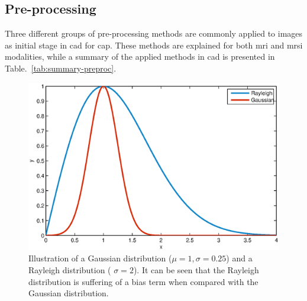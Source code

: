 \subsection{Pre-processing}\label{subsec:chp3img-reg:prepro}
Three different groups of pre-processing methods are commonly applied to images as initial stage in \ac{cad} for \ac{cap}.
These methods are explained for both \ac{mri} and \ac{mrsi} modalities, while a summary of the applied methods in \ac{cad} is presented in Table.~\ref{tab:summary-preproc}.


\begin{figure}
\centering
	\includegraphics[width=0.7\linewidth]{3_review/figures/processing/pre-processing/noise/noisedistr.eps}
	\caption[Illustration of a Gaussian and Rayleigh distributions.]{Illustration of a Gaussian distribution ($\mu = 1, \sigma=0.25$) and a Rayleigh distribution ( $\sigma = 2$). It can be seen that the Rayleigh distribution is suffering of a bias term when compared with the Gaussian distribution.}
	\label{fig:noisedistr}
\end{figure}

